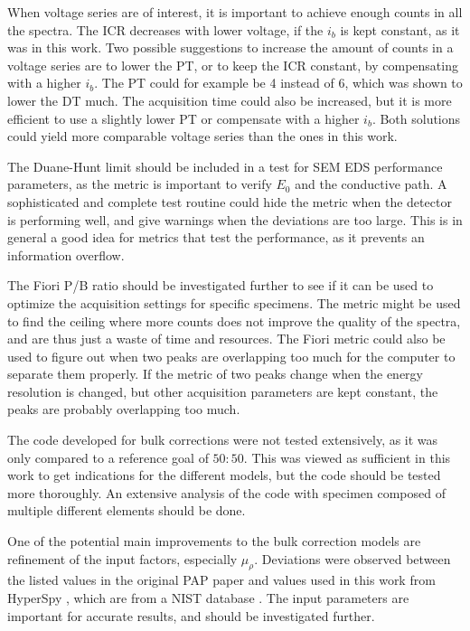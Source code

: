 When voltage series are of interest, it is important to achieve enough counts in all the spectra.
The ICR decreases with lower voltage, if the $i_b$ is kept constant, as it was in this work.
Two possible suggestions to increase the amount of counts in a voltage series are to lower the PT, or to keep the ICR constant, by compensating with a higher $i_b$.
The PT could for example be 4 instead of 6, which was shown to lower the DT much.
The acquisition time could also be increased, but it is more efficient to use a slightly lower PT or compensate with a higher $i_b$.
Both solutions could yield more comparable voltage series than the ones in this work.

The Duane-Hunt limit should be included in a test for SEM EDS performance parameters, as the metric is important to verify $E_0$ and the conductive path.
A sophisticated and complete test routine could hide the metric when the detector is performing well, and give warnings when the deviations are too large.
This is in general a good idea for metrics that test the performance, as it prevents an information overflow.

The Fiori P/B ratio should be investigated further to see if it can be used to optimize the acquisition settings for specific specimens.
The metric might be used to find the ceiling where more counts does not improve the quality of the spectra, and are thus just a waste of time and resources.
The Fiori metric could also be used to figure out when two peaks are overlapping too much for the computer to separate them properly.
If the metric of two peaks change when the energy resolution is changed, but other acquisition parameters are kept constant, the peaks are probably overlapping too much.

The code developed for bulk corrections were not tested extensively, as it was only compared to a reference goal of $50:50$.
This was viewed as sufficient in this work to get indications for the different models, but the code should be tested more thoroughly.
An extensive analysis of the code with specimen composed of multiple different elements should be done.

One of the potential main improvements to the bulk correction models are refinement of the input factors, especially $\mu_\rho$.
Deviations were observed between the listed values in the original PAP paper \cite{pap_1991} and values used in this work from HyperSpy \cite{hyperspy_1.7.1}, which are from a NIST database \cite{nist_xraydatabase_hyperspy}.
The input parameters are important for accurate results, and should be investigated further.

